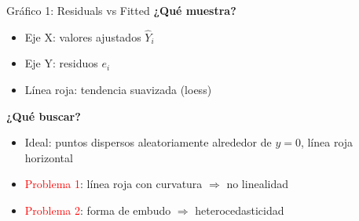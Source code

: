 \documentclass[aspectratio=169, 11pt]{beamer}
\begin{document}
\begin{frame}{Gráfico 1: Residuals vs Fitted}
\textbf{¿Qué muestra?}
\begin{itemize}
\item Eje X: valores ajustados $\hat{Y}_i$
\item Eje Y: residuos $e_i$
\item Línea roja: tendencia suavizada (loess)
\end{itemize}

\vspace{0.3cm}
\textbf{¿Qué buscar?}
\begin{itemize}
\item \textcolor{javerianalight}{Ideal}: puntos dispersos aleatoriamente alrededor de $y=0$, línea roja horizontal
\item \textcolor{red}{Problema 1}: línea roja con curvatura $\Rightarrow$ no linealidad
\item \textcolor{red}{Problema 2}: forma de embudo $\Rightarrow$ heterocedasticidad
\end{itemize}
\end{frame}
\end{document}
